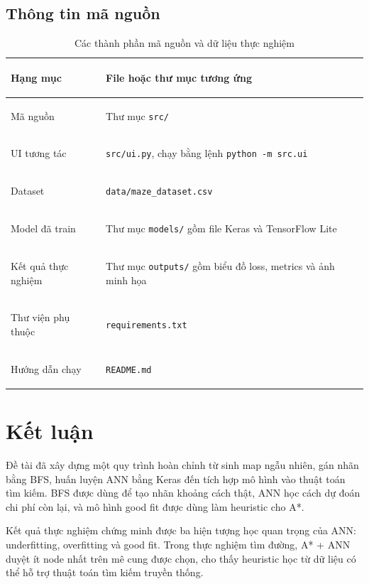 \documentclass[12pt,a4paper]{article}
\begin{document}
\subsection{Thông tin mã nguồn}

\begin{table}[H]
\centering
\caption{Các thành phần mã nguồn và dữ liệu thực nghiệm}
\begin{tabularx}{0.95\textwidth}{>{\bfseries\raggedright\arraybackslash}p{}Y}
\toprule
Hạng mục & File hoặc thư mục tương ứng \\
\midrule
Mã nguồn & Thư mục \texttt{src/} \\
UI tương tác & \texttt{src/ui.py}, chạy bằng lệnh \texttt{python -m src.ui} \\
Dataset & \texttt{data/maze\_dataset.csv} \\
Model đã train & Thư mục \texttt{models/} gồm file Keras và TensorFlow Lite \\
Kết quả thực nghiệm & Thư mục \texttt{outputs/} gồm biểu đồ loss, metrics và ảnh minh họa \\
Thư viện phụ thuộc & \texttt{requirements.txt} \\
Hướng dẫn chạy & \texttt{README.md} \\
\bottomrule
\end{tabularx}
\end{table}

\section{Kết luận}

Đề tài đã xây dựng một quy trình hoàn chỉnh từ sinh map ngẫu nhiên, gán nhãn bằng BFS, huấn luyện ANN bằng Keras đến tích hợp mô hình vào thuật toán tìm kiếm. BFS được dùng để tạo nhãn khoảng cách thật, ANN học cách dự đoán chi phí còn lại, và mô hình good fit được dùng làm heuristic cho A*.

Kết quả thực nghiệm chứng minh được ba hiện tượng học quan trọng của ANN: underfitting, overfitting và good fit. Trong thực nghiệm tìm đường, A* + ANN duyệt ít node nhất trên mê cung được chọn, cho thấy heuristic học từ dữ liệu có thể hỗ trợ thuật toán tìm kiếm truyền thống.
\end{document}
